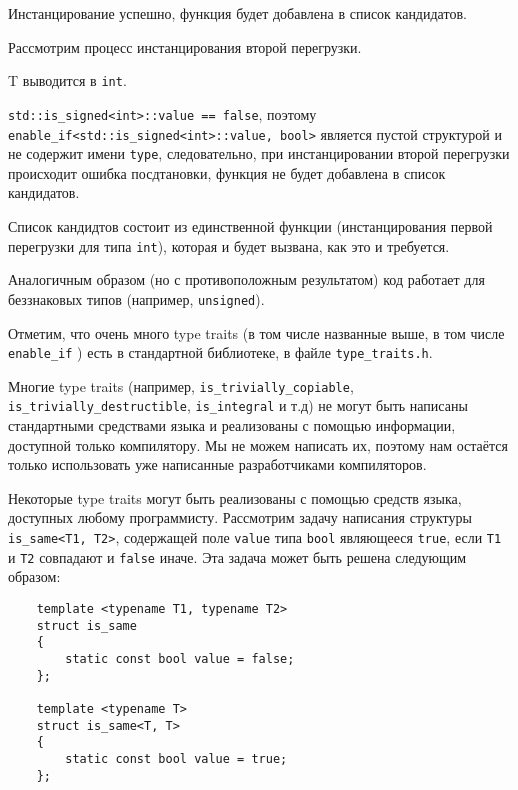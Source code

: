 	Инстанцирование успешно, функция будет добавлена в список кандидатов.
	
	Рассмотрим процесс инстанцирования второй перегрузки.
	
	T выводится в \texttt{int}.
	
	\texttt{std::is_signed<int>::value == false}, поэтому \texttt{enable_if<std::is_signed<int>::value, bool>} является пустой структурой и не содержит имени \texttt{type}, следовательно, при инстанцировании второй перегрузки происходит ошибка посдтановки, функция не будет добавлена в список кандидатов.
	
	Список кандидтов состоит из единственной функции (инстанцирования первой перегрузки для типа \texttt{int}), которая и будет вызвана, как это и требуется.
	
	Аналогичным образом (но с противоположным результатом) код работает для беззнаковых типов (например, \texttt{unsigned}).
	
	\vspace{\baselineskip}
	
	Отметим, что очень много type traits (в том числе названные выше, в том числе \texttt{enable_if} ) есть в стандартной библиотеке, в файле \texttt{type_traits.h}.
	
	Многие type traits (например, \texttt{is_trivially_copiable}, \texttt{is_trivially_destructible}, \texttt{is_integral} и т.д) не могут быть написаны стандартными средствами языка и реализованы с помощью информации, доступной только компилятору. Мы не можем написать их, поэтому нам остаётся только использовать уже написанные разработчиками компиляторов.
	
	\vspace{\baselineskip}
	
	Некоторые type traits могут быть реализованы с помощью средств языка, доступных любому программисту. Рассмотрим задачу написания структуры \texttt{is_same<T1, T2>}, содержащей поле \texttt{value} типа \texttt{bool} являющееся \texttt{true}, если \texttt{T1} и \texttt{T2} совпадают и \texttt{false} иначе. Эта задача может быть решена следующим образом:
	
	\begin{verbatim}
	template <typename T1, typename T2>
	struct is_same
	{
		static const bool value = false;
	};
	
	template <typename T>
	struct is_same<T, T>
	{
		static const bool value = true;
	};
	\end{verbatim}
	
